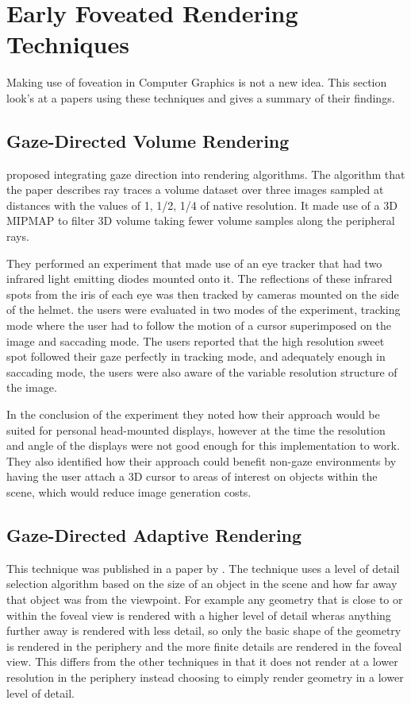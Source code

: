 \section{Early Foveated Rendering Techniques}
Making use of foveation in Computer Graphics is not a new idea. This section look's at a papers using these techniques and gives a summary of their findings.
\subsection{Gaze-Directed Volume Rendering}
\cite{Levoy} proposed integrating gaze direction into rendering algorithms. The algorithm that the paper describes ray traces a volume dataset over three images sampled at distances with the values of 1, 1/2, 1/4 of native resolution. It made use of a 3D MIPMAP to filter 3D volume taking fewer volume samples along the peripheral rays.

They performed an experiment that made use of an eye tracker that had two infrared light emitting diodes mounted onto it. The reflections of these infrared spots from the iris of each eye was then tracked by cameras mounted on the side of the helmet. the users were evaluated in two modes of the experiment, tracking mode where the user had to follow the motion of a cursor superimposed on the image and saccading mode. The users reported that the high resolution sweet spot followed their gaze perfectly in tracking mode, and adequately enough in saccading mode, the users were also aware of the variable resolution structure of the image. 

In the conclusion of the experiment they noted how their approach would be suited for personal head-mounted displays, however at the time the resolution and angle of the displays were not good enough for this implementation to work. They also identified how their approach could benefit non-gaze environments by having the user attach a 3D cursor to areas of interest on objects within the scene, which would reduce image generation costs. 

\subsection{Gaze-Directed Adaptive Rendering}
This technique was published in a paper by \cite{Ohshima}. The technique uses a level of detail selection algorithm based on the size of an object in the scene and how far away that object was from the viewpoint. For example any geometry that is close to or within the foveal view is rendered with a higher level of detail wheras anything further away is rendered with less detail, so only the basic shape of the geometry is rendered in the periphery and the more finite details are rendered in the foveal view. This differs from the other techniques in that it does not render at a lower resolution in the periphery instead choosing to eimply render geometry in a lower level of detail.

